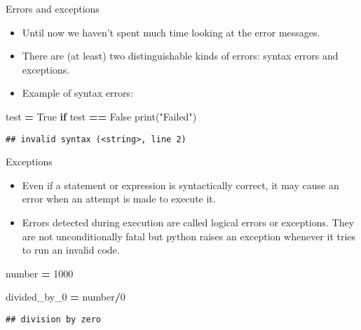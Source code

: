 \documentclass[
  8pt,
  ignorenonframetext,
]{beamer}
\newenvironment{Shaded}{\begin{snugshade}}{\end{snugshade}}
\newcommand{\BuiltInTok}[1]{#1}
\newcommand{\ControlFlowTok}[1]{\textcolor[rgb]{0.13,0.29,0.53}{\textbf{#1}}}
\newcommand{\DecValTok}[1]{\textcolor[rgb]{0.00,0.00,0.81}{#1}}
\newcommand{\NormalTok}[1]{#1}
\newcommand{\OperatorTok}[1]{\textcolor[rgb]{0.81,0.36,0.00}{\textbf{#1}}}
\newcommand{\StringTok}[1]{\textcolor[rgb]{0.31,0.60,0.02}{#1}}
\newcommand{\VariableTok}[1]{\textcolor[rgb]{0.00,0.00,0.00}{#1}}
\begin{document}
\begin{frame}[fragile]{Errors and exceptions}
\protect\hypertarget{errors-and-exceptions}{}
\begin{itemize}
\item
  Until now we haven't spent much time looking at the error messages.
\item
  There are (at least) two distinguishable kinds of errors: syntax
  errors and exceptions.
\item
  Example of syntax errors:
\end{itemize}

\begin{Shaded}
\begin{Highlighting}[]
\NormalTok{test }\OperatorTok{=} \VariableTok{True}
\ControlFlowTok{if}\NormalTok{ test }\OperatorTok{==} \VariableTok{False}
  \BuiltInTok{print}\NormalTok{(}\StringTok{"Failed"}\NormalTok{)}
\end{Highlighting}
\end{Shaded}

\begin{verbatim}
## invalid syntax (<string>, line 2)
\end{verbatim}
\end{frame}

\begin{frame}[fragile]{Exceptions}
\protect\hypertarget{exceptions}{}
\begin{itemize}
\item
  Even if a statement or expression is syntactically correct, it may
  cause an error when an attempt is made to execute it.
\item
  Errors detected during execution are called logical errors or
  exceptions. They are not unconditionally fatal but python raises an
  exception whenever it tries to run an invalid code.
\end{itemize}

\begin{Shaded}
\begin{Highlighting}[]
\NormalTok{number }\OperatorTok{=} \DecValTok{1000}

\NormalTok{divided\_by\_0 }\OperatorTok{=}\NormalTok{ number}\OperatorTok{/}\DecValTok{0} 
\end{Highlighting}
\end{Shaded}

\begin{verbatim}
## division by zero
\end{verbatim}
\end{frame}
\end{document}
